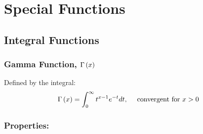 \section{Special Functions}
\subsection{Integral Functions}
\subsubsection{Gamma Function, $\Gamma\left(x\right)$}
Defined by the integral:
\begin{equation}
    \Gamma\left(x\right)=\int_{0}^{\infty}t^{x-1}e^{-t}dt,\quad\text{ convergent for }x>0
\end{equation}
\subsubsection*{Properties:}
